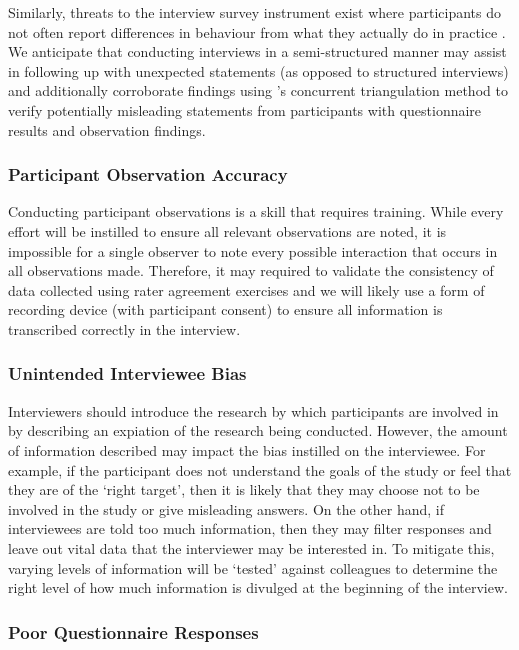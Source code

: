 Similarly, threats to the interview survey instrument exist where participants do not often report differences in behaviour from what they actually do in practice \citep{Singer:2007tu}. We anticipate that conducting interviews in a semi-structured manner may assist in following up with unexpected statements (as opposed to structured interviews) and additionally corroborate findings using \citeauthor{Jick:1979el}'s concurrent triangulation method \citep{Jick:1979el} to verify potentially misleading statements from participants with questionnaire results and observation findings.

\subsubsection{Participant Observation Accuracy}

Conducting participant observations is a skill that requires training. While every effort will be instilled to ensure all relevant observations are noted, it is impossible for a single observer to note every possible interaction that occurs in all observations made. Therefore, it may required to validate the consistency of data collected using rater agreement exercises \citep{Judd:1991ug} and we will likely use a form of recording device (with participant consent) to ensure all information is transcribed correctly in the interview.

\subsubsection{Unintended Interviewee Bias}

Interviewers should introduce the research by which participants are involved in by describing an expiation of the research being conducted. However, the amount of information described may impact the bias instilled on the interviewee. For example, if the participant does not understand the goals of the study or feel that they are of the `right target', then it is likely that they may choose not to be involved in the study or give misleading answers. On the other hand, if interviewees are told too much information, then they may filter responses and leave out vital data that the interviewer may be interested in. To mitigate this, varying levels of information will be `tested' against colleagues to determine the right level of how much information is divulged at the beginning of the interview.

\subsubsection{Poor Questionnaire Responses}

